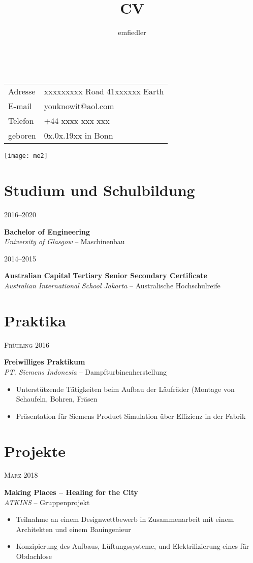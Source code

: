 \documentclass[a4paper]{article}
\title{CV}
\author{emfiedler}
\makeatletter
\renewcommand{\maketitle}{
\begin{flushleft}
{\Huge
\theauthor}\\
\vspace{3mm}
\hspace{3mm} 
\begingroup
\renewcommand{\arraystretch}{1.2}
\begin{tabular}{@{} p{15mm} p{50mm}}
	Adresse	&xxxxxxxxx Road 41\newline xxxxxx Earth\\
	E-mail 	&youknowit@aol.com\\
	Telefon	&+44 xxxx xxx xxx\\
	geboren	&0x.0x.19xx in Bonn
\end{tabular}
\endgroup

\end{flushleft}
}
\newcommand{\entry}[4]{

	\begin{minipage}[t]{.20\textwidth}
		\hfill \textsc{#1}

	\end{minipage}
	\hfill\vline\hfill
	\begin{minipage}[t]{.75\textwidth}
		\textbf{#2}\\ 
		\textit{#3}    
		#4

	\end{minipage} 
	\vspace{.25cm}

}
\makeatother
\begin{document}

\begin{minipage}{0.73\textwidth}
\maketitle
\end{minipage}
\begin{minipage}{0.25\textwidth}
	\hspace{2mm} 
	\vspace{-2mm} 
	\texttt{[image: me2]}
\end{minipage}

\vspace{1em}

\section{Studium und Schulbildung}

\entry{2016--2020}{Bachelor of Engineering}{University of Glasgow}{-- Maschinenbau}

\entry{2014--2015}{Australian Capital Tertiary Senior Secondary Certificate}{Australian International School Jakarta}{-- Australische Hochschulreife}

\section{Praktika}

\entry{Fr{\"u}hling 2016}{Freiwilliges Praktikum}{PT. Siemens Indonesia}{-- Dampfturbinenherstellung\vspace{-.25cm} 
	\begin{itemize}[leftmargin=*]
		\setlength{\itemsep}{-3pt}
		\item Unterst{\"u}tzende T{\"a}tigkeiten beim Aufbau der L{\"a}ufr{\"a}der \newline \phantom{W}(Montage von Schaufeln, Bohren, Fr{\"a}sen
		\item Pr{\"a}sentation f{\"u}r Siemens Product Simulation {\"u}ber Effizienz in der Fabrik
	\end{itemize}	
}

\section{Projekte}

\entry{M{\"a}rz 2018}{Making Places -- Healing for the City}{ATKINS}{-- Gruppenprojekt
\vspace{-.25cm} 
	\begin{itemize}[leftmargin=*]
		\setlength{\itemsep}{-3pt}
	\item Teilnahme an einem Designwettbewerb in Zusammenarbeit mit einem \newline\phantom{W}Architekten und einem Bauingenieur 
	\item Konzipierung des Aufbaus, L{\"u}ftungssysteme, und Elektrifizierung \newline\phantom{W}eines \glqq{Container-Home\grqq} f{\"u}r Obdachlose
	\end{itemize}
}
\end{document}
